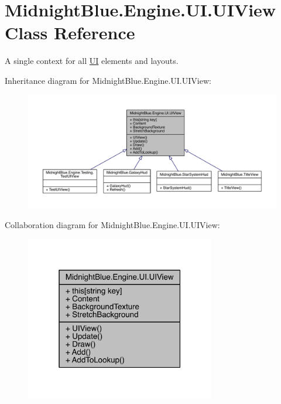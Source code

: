 \hypertarget{class_midnight_blue_1_1_engine_1_1_u_i_1_1_u_i_view}{}\section{Midnight\+Blue.\+Engine.\+U\+I.\+U\+I\+View Class Reference}
\label{class_midnight_blue_1_1_engine_1_1_u_i_1_1_u_i_view}


A single context for all \hyperlink{namespace_midnight_blue_1_1_engine_1_1_u_i}{UI} elements and layouts.  




Inheritance diagram for Midnight\+Blue.\+Engine.\+U\+I.\+U\+I\+View\+:
\nopagebreak
\begin{figure}[H]
\begin{center}
\leavevmode
\includegraphics[width=350pt]{class_midnight_blue_1_1_engine_1_1_u_i_1_1_u_i_view__inherit__graph}
\end{center}
\end{figure}


Collaboration diagram for Midnight\+Blue.\+Engine.\+U\+I.\+U\+I\+View\+:
\nopagebreak
\begin{figure}[H]
\begin{center}
\leavevmode
\includegraphics[width=235pt]{class_midnight_blue_1_1_engine_1_1_u_i_1_1_u_i_view__coll__graph}
\end{center}
\end{figure}
